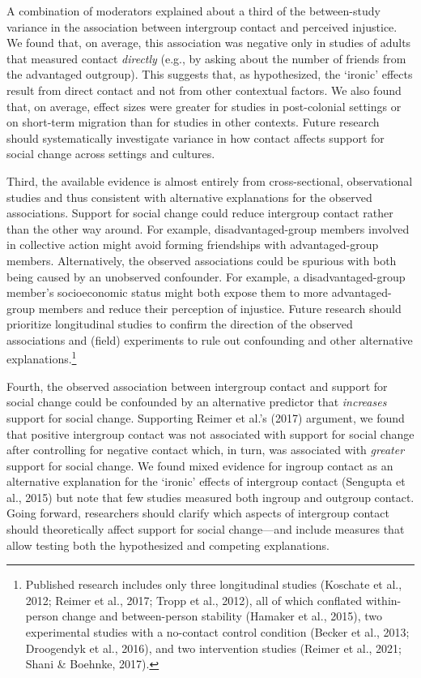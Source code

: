 \documentclass[12pt, letterpaper]{article}
\begin{document}
A combination of moderators explained about a third of the between-study
variance in the association between intergroup contact and perceived
injustice. We found that, on average, this association was negative only
in studies of adults that measured contact \emph{directly} (e.g., by
asking about the number of friends from the advantaged outgroup). This
suggests that, as hypothesized, the `ironic' effects result from direct
contact and not from other contextual factors. We also found that, on
average, effect sizes were greater for studies in post-colonial settings
or on short-term migration than for studies in other contexts. Future
research should systematically investigate variance in how contact
affects support for social change across settings and cultures.

Third, the available evidence is almost entirely from cross-sectional,
observational studies and thus consistent with alternative explanations
for the observed associations. Support for social change could reduce
intergroup contact rather than the other way around. For example,
disadvantaged-group members involved in collective action might avoid
forming friendships with advantaged-group members. Alternatively, the
observed associations could be spurious with both being caused by an
unobserved confounder. For example, a disadvantaged-group member's
socioeconomic status might both expose them to more advantaged-group
members and reduce their perception of injustice. Future research should
prioritize longitudinal studies to confirm the direction of the observed
associations and (field) experiments to rule out confounding and other
alternative explanations.\footnote{Published research includes only
  three longitudinal studies (Koschate et al., 2012; Reimer et al.,
  2017; Tropp et al., 2012), all of which conflated within-person change
  and between-person stability (Hamaker et al., 2015), two experimental
  studies with a no-contact control condition (Becker et al., 2013;
  Droogendyk et al., 2016), and two intervention studies (Reimer et al.,
  2021; Shani \& Boehnke, 2017).}

Fourth, the observed association between intergroup contact and support
for social change could be confounded by an alternative predictor that
\emph{increases} support for social change. Supporting Reimer et al.'s
(2017) argument, we found that positive intergroup contact was not
associated with support for social change after controlling for negative
contact which, in turn, was associated with \emph{greater} support for
social change. We found mixed evidence for ingroup contact as an
alternative explanation for the `ironic' effects of intergroup contact
(Sengupta et al., 2015) but note that few studies measured both ingroup
and outgroup contact. Going forward, researchers should clarify which
aspects of intergroup contact should theoretically affect support for
social change---and include measures that allow testing both the
hypothesized and competing explanations.
\end{document}
